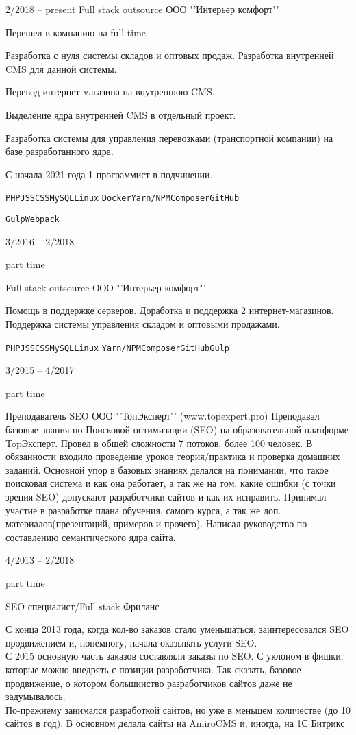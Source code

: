 \begin{entrylist}
	\entry
		{2/2018 -- present}
		{Full stack outsource}
		{ООО "'Интерьер комфорт"' }
		{Перешел в компанию на full-time.

    Разработка с нуля системы складов и оптовых продаж. Разработка внутренней CMS для данной системы.

		Перевод интернет магазина на внутреннюю CMS.

		Выделение ядра внутренней CMS в отдельный проект.

		Разработка системы для управления перевозками (транспортной компании) на базе разработанного ядра.

		С начала 2021 года 1 программист в подчинении.

		\texttt{PHP}\slashsep\texttt{JS}\slashsep\texttt{SCSS}\slashsep\texttt{MySQL}\slashsep\texttt{Linux}
    \slashsep\texttt{Docker}\slashsep\texttt{Yarn/NPM}\slashsep\texttt{Composer}\slashsep\texttt{GitHub}

    \texttt{Gulp}\slashsep\texttt{Webpack}}

	\entry
		{3/2016 -- 2/2018

		\footnotesize{part time}}
		{Full stack outsource}
		{ООО "'Интерьер комфорт"' }
		{Помощь в поддержке серверов. Доработка и поддержка 2 интернет-магазинов. Поддержка системы управления складом и оптовыми продажами.

		\texttt{PHP}\slashsep\texttt{JS}\slashsep\texttt{SCSS}\slashsep\texttt{MySQL}\slashsep\texttt{Linux}
    \slashsep\texttt{Yarn/NPM}\slashsep\texttt{Composer}\slashsep\texttt{GitHub}\slashsep\texttt{Gulp}
    }

	\entry
		{3/2015 -- 4/2017

		\footnotesize{part time}}
		{Преподаватель SEO}
		{ООО "'ТопЭксперт"' (www.topexpert.pro)}
		{Преподавал базовые знания по Поисковой оптимизации (SEO) на образовательной платформе TopЭксперт. Провел в общей сложности 7 потоков, более 100 человек. В обязанности входило проведение уроков теория/практика и проверка домашних заданий. Основной упор в базовых знаниях делался на понимании, что такое поисковая система и как она работает, а так же на том, какие ошибки (с точки зрения SEO) допускают разработчики сайтов и как их исправить. Принимал участие в разработке плана обучения, самого курса, а так же доп. материалов(презентаций, примеров и прочего). Написал руководство по составлению семантического ядра сайта.}

	\entry
		{4/2013 -- 2/2018

		\footnotesize{part time}}
		{SEO специалист/Full stack}
		{Фриланс}
		{С конца 2013 года, когда кол-во заказов стало уменьшаться, заинтересовался SEO продвижением и, понемногу, начала оказывать услуги SEO.\\
		С 2015 основную часть заказов составляли заказы по SEO. С уклоном в фишки, которые можно внедрять с позиции разработчика. Так сказать, базовое продвижение, о котором большинство разработчиков сайтов даже не задумывалось.\\
		По-прежнему занимался разработкой сайтов, но уже в меньшем количестве (до 10 сайтов в год). В основном делала сайты на AmiroCMS и, иногда, на 1С Битрикс

}
\end{entrylist}
